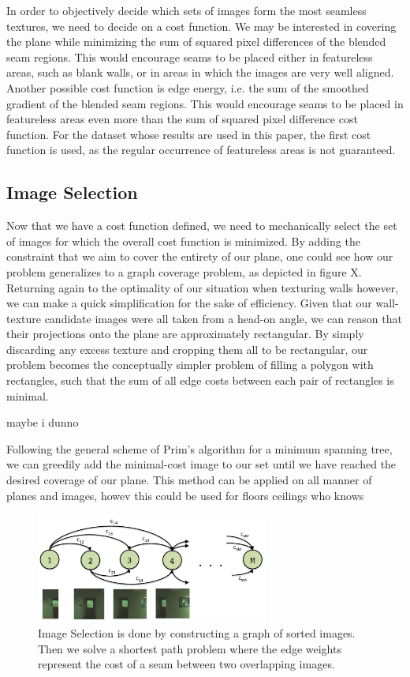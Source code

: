 \documentclass[10pt,twocolumn,letterpaper]{article}
\begin{document}
In order to objectively decide which sets of images form the most seamless textures, we need to decide on a cost function. We may be interested in covering the plane while minimizing the sum of squared pixel differences of the blended seam regions. This would encourage seams to be placed either in featureless areas, such as blank walls, or in areas in which the images are very well aligned. Another possible cost function is edge energy, i.e. the sum of the smoothed gradient of the blended seam regions. This would encourage seams to be placed in featureless areas even more than the sum of squared pixel difference cost function. For the dataset whose results are used in this paper, the first cost function is used, as the regular occurrence of featureless areas is not guaranteed.

\subsection{Image Selection}

Now that we have a cost function defined, we need to mechanically select the set of images for which the overall cost function is minimized.
By adding the constraint that we aim to cover the entirety of our plane, one could see how our problem generalizes to a graph coverage problem, as depicted in figure X. Returning again to the optimality of our situation when texturing walls however, we can make a quick simplification for the sake of efficiency. Given that our wall-texture candidate images were all taken from a head-on angle, we can reason that their projections onto the plane are approximately rectangular. By simply discarding any excess texture and cropping them all to be rectangular, our problem becomes the conceptually simpler problem of filling a polygon with rectangles, such that the sum of all edge costs between each pair of rectangles is minimal. 

maybe i dunno

Following the general scheme of Prim's algorithm for a minimum spanning tree, we can greedily add the minimal-cost image to our set until we have reached the desired coverage of our plane. This method can be applied on all manner of planes and images, howev this could be used for floors ceilings who knows



\begin{figure}
\centering
\includegraphics[width=3in]{DynProg.pdf}
\caption{Image Selection is done by constructing a graph of sorted images. Then we solve a shortest path problem where the edge weights represent the cost of a seam between two overlapping images.}
\label{fig:DynProg}
\end{figure}
\end{document}

